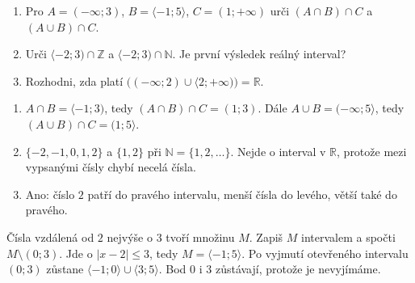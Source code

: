 \documentclass[11pt,a4paper]{article}
\begin{document}
\begin{zadaniReseniBox}[title={Rozšíření 2}]
\begin{enumerate}[label=\alph*)]
\item Pro $A=(-\infty;3)$, $B=\langle-1;5\rangle$, $C=(1;+\infty)$
urči $(A\cap B)\cap C$ a $(A\cup B)\cap C$.
\item Urči $\langle-2;3)\cap\mathbb Z$ a $\langle-2;3)\cap\mathbb N$.
Je první výsledek reálný interval?
\item Rozhodni, zda platí
$\bigl((-\infty;2)\cup\langle2;+\infty)\bigr)=\mathbb R$.
\end{enumerate}
\tcblower
\begin{enumerate}[label=\alph*)]
\item $A\cap B=\langle-1;3)$, tedy $(A\cap B)\cap C=(1;3)$.
Dále $A\cup B=(-\infty;5\rangle$, tedy $(A\cup B)\cap C=(1;5\rangle$.
\item $\{-2,-1,0,1,2\}$ a $\{1,2\}$ při $\mathbb N=\{1,2,\ldots\}$.
Nejde o interval v $\mathbb R$, protože mezi vypsanými čísly chybí necelá čísla.
\item Ano: číslo $2$ patří do pravého intervalu, menší čísla do levého,
větší také do pravého.
\end{enumerate}
\end{zadaniReseniBox}

\begin{zadaniReseniBox}[title={Rozšíření 3},breakable=false]
Čísla vzdálená od $2$ nejvýše o $3$ tvoří množinu $M$.
Zapiš $M$ intervalem a spočti $M\setminus(0;3)$.
\tcblower
Jde o $|x-2|\le3$, tedy $M=\langle-1;5\rangle$.
Po vyjmutí otevřeného intervalu $(0;3)$ zůstane
$\langle-1;0\rangle\cup\langle3;5\rangle$.
Bod $0$ i $3$ zůstávají, protože je nevyjímáme.
\end{zadaniReseniBox}
\end{document}
